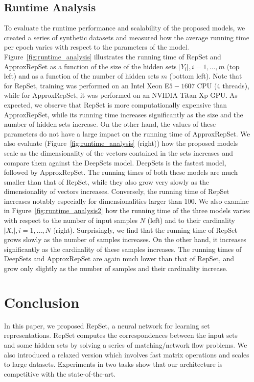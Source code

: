 \documentclass[twoside]{article}
\begin{document}
\subsection{Runtime Analysis}
To evaluate the runtime performance and scalability of the proposed models, we created a series of synthetic datasets and measured how the average running time per epoch varies with respect to the parameters of the model.
Figure~\ref{fig:runtime_analysis} illustrates the running time of RepSet and ApproxRepSet as a function of the size of the hidden sets $|Y_i|, i=1,\ldots,m$ (top left) and as a function of the number of hidden sets $m$ (bottom left). 
Note that for RepSet, training was performed on an Intel Xeon E$5-1607$ CPU ($4$ threads), while for ApproxRepSet, it was performed on an NVIDIA Titan Xp GPU.
As expected, we observe that RepSet is more computationally expensive than ApproxRepSet, while its running time increases significantly as the size and the number of hidden sets increase.
On the other hand, the values of these parameters do not have a large impact on the running time of ApproxRepSet.
We also evaluate (Figure~\ref{fig:runtime_analysis} (right)) how the proposed models scale as the dimensionality of the vectors contained in the sets increases and compare them against the DeepSets model.
DeepSets is the fastest model, followed by ApproxRepSet.
The running times of both these models are much smaller than that of RepSet, while they also grow very slowly as the dimensionality of vectors increases.
Conversely, the running time of RepSet increases notably especially for dimensionalities larger than $100$.
We also examine in Figure~\ref{fig:runtime_analysis2} how the running time of the three models varies with respect to the number of input samples $N$ (left) and to their cardinality $|X_i|, i=1,\ldots,N$ (right).
Surprisingly, we find that the running time of RepSet grows slowly as the number of samples increases.
On the other hand, it increases significantly as the cardinality of these samples increases.
The running times of DeepSets and ApproxRepSet are again much lower than that of RepSet, and grow only slightly as the number of samples and their cardinality increase.

\section{Conclusion}\label{sec:conclusion}
In this paper, we proposed RepSet, a neural network for learning set representations.
RepSet computes the correspondences between the input sets and some hidden sets by solving a series of matching/network flow problems.
We also introduced a relaxed version which involves fast matrix operations and scales to large datasets.
Experiments in two tasks show that our architecture is competitive with the state-of-the-art.
\end{document}

